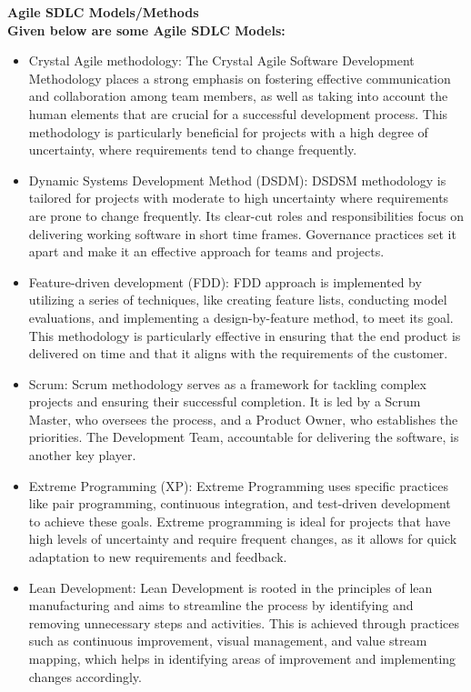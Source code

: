 \textbf{\large Agile SDLC Models/Methods}\\
\textbf{Given below are some Agile SDLC Models:}
\begin{itemize}
    \item Crystal Agile methodology: The Crystal Agile Software Development Methodology places a strong emphasis on fostering effective communication and collaboration among team members, as well as taking into account the human elements that are crucial for a successful development process. This methodology is particularly beneficial for projects with a high degree of uncertainty, where requirements tend to change frequently.
    
    \item Dynamic Systems Development Method (DSDM): DSDSM methodology is tailored for projects with moderate to high uncertainty where requirements are prone to change frequently. Its clear-cut roles and responsibilities focus on delivering working software in short time frames. Governance practices set it apart and make it an effective approach for teams and projects.
    
    \item Feature-driven development (FDD): FDD approach is implemented by utilizing a series of techniques, like creating feature lists, conducting model evaluations, and implementing a design-by-feature method, to meet its goal. This methodology is particularly effective in ensuring that the end product is delivered on time and that it aligns with the requirements of the customer.

    \item Scrum: Scrum methodology serves as a framework for tackling complex projects and ensuring their successful completion. It is led by a Scrum Master, who oversees the process, and a Product Owner, who establishes the priorities. The Development Team, accountable for delivering the software, is another key player.

    \item Extreme Programming (XP): Extreme Programming uses specific practices like pair programming, continuous integration, and test-driven development to achieve these goals. Extreme programming is ideal for projects that have high levels of uncertainty and require frequent changes, as it allows for quick adaptation to new requirements and feedback.

    \item Lean Development: Lean Development is rooted in the principles of lean manufacturing and aims to streamline the process by identifying and removing unnecessary steps and activities. This is achieved through practices such as continuous improvement, visual management, and value stream mapping, which helps in identifying areas of improvement and implementing changes accordingly. 


\end{itemize}
